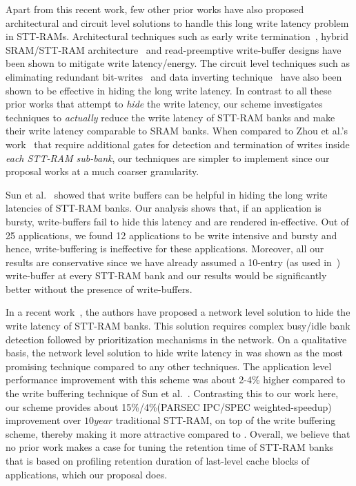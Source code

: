 Apart from this recent work, few other prior works have also proposed architectural and circuit level
solutions to handle this long write latency problem in STT-RAMs. Architectural techniques such as
early write termination~\cite{mram-energy-reduction}, hybrid SRAM/STT-RAM
architecture~\cite{gsun-hpca, Qureshi:2009:SHPMM} and read-preemptive write-buffer designs have been
shown to mitigate write latency/energy. The circuit level techniques such as eliminating redundant
bit-writes~\cite{mram-energy-reduction} and data inverting technique~\cite{gsun-hpca} have also been
shown to be effective in hiding the long write latency. In contrast to all these prior works that
attempt to {\it hide} the write latency, our scheme investigates techniques to {\it actually} reduce
the write latency of STT-RAM banks and make their write latency comparable to SRAM banks. When
compared to Zhou et al.'s work~\cite{mram-energy-reduction} that require additional gates for
detection and termination of writes inside {\it each STT-RAM sub-bank}, our techniques are simpler to
implement since our proposal works at a much coarser granularity.

Sun et al.~\cite{gsun-hpca} showed that write buffers can be helpful in hiding the long write
latencies of STT-RAM banks. Our analysis shows that, if an application is bursty, write-buffers fail
to hide this latency and are rendered in-effective. Out of 25 applications, we found 12 applications
to be write intensive and bursty and hence, write-buffering is ineffective for these applications.
Moreover, all our results are conservative since we have already assumed a 10-entry (as used
in~\cite{gsun-hpca}) write-buffer at every STT-RAM bank and our results would be significantly better
without the presence of write-buffers.

In a recent work~\cite{mram-noc}, the authors have proposed a network level solution to hide the
write latency of STT-RAM banks. This solution requires complex busy/idle bank detection followed by
prioritization mechanisms in the network. On a qualitative basis, the network level solution to hide
write latency in \cite{mram-noc} was shown as the most promising technique compared to any other
techniques. The application level performance improvement with this scheme was about 2-4\% higher
compared to the write buffering technique of Sun et al.~\cite{gsun-hpca}. Contrasting this to our
work here, our scheme provides about 15\%/4\%(PARSEC IPC/SPEC weighted-speedup) improvement over $10year$
traditional STT-RAM, on top of the write buffering scheme, thereby making it more attractive compared
to \cite{mram-noc}. Overall, we believe that no prior work makes a case for tuning the retention time
of STT-RAM banks that is based on profiling retention duration of last-level cache blocks of
applications, which our proposal does.
